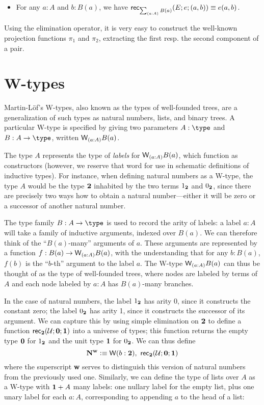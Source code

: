 \begin{itemize}
\item For any $a : A$ and $b : B(a)$, we have $\rec{\sm{a:A} B(a)}(E;e;(a,b)) \equiv e(a,b)$.
\end{itemize}
Using the elimination operator, it is very easy to construct the well-known projection functions $\pi_1$ and $\pi_2$, extracting the first resp. the second component of a pair.


\section{W-types}
\label{sec:w-types}

Martin-L{\"o}f's W-types, also known as the types of well-founded trees, are a generalization of such types as natural numbers, lists, and binary trees. A particular W-type is specified by giving two parameters $A : \type$ and $B : A \to \type$, written $\wtype{a:A} B(a)$.

The type $A$ represents the type of \emph{labels} for $\wtype{a :A} B(a)$, which function as constructors (however, we reserve that word for use in schematic definitions of inductive types). For instance, when defining natural numbers as a W-type, the type $A$ would be the type $\mathbf{2}$ inhabited by the two terms $1_{\mathbf{2}}$ and $0_{\mathbf{2}}$, since there are precisely two ways how to obtain a natural number---either it will be zero or a successor of another natural number. 

The type family $B : A \to \type$ is used to record the arity of labels: a label $a : A$ will take a family of inductive arguments, indexed over $B(a)$. We can therefore think of the ``$B(a)$-many'' arguments of $a$. These arguments are represented by a function $f : B(a) \to \wtype{a :A} B(a)$, with the understanding that for any $b : B(a)$, $f(b)$ is the ``$b$-th'' argument to the label $a$. The W-type $\wtype{a :A} B(a)$ can thus be thought of as the type of well-founded trees, where nodes are labeled by terms of $A$ and each node labeled by $a : A$ has $B(a)$-many branches.

In the case of natural numbers, the label $1_{\mathbf{2}} $ has arity 0, since it constructs the constant zero; the label $0_{\mathbf{2}}$ has arity 1, since it constructs the successor of its argument. We can capture this by using simple elimination on $\mathbf{2}$ to define a function $\mathsf{rec}_{\mathbf{2}}(\mathcal{U};\mathbf{0};\mathbf{1})$ into a universe of types; this function returns the empty type $\mathbf{0}$ for $1_{\mathbf{2}}$ and the unit type $\mathbf{1}$ for $0_{\mathbf{2}}$. We can thus define
\[ \natw \defeq \wtype{b:\two} \rec\two(\bbU;\zero;\one) \]
where the superscript \textbf{w} serves to distinguish this version of natural numbers from the previously used one.
Similarly, we can define the type of lists over $A$ as a W-type with $\mathbf{1} + A$ many labels: one nullary label for the empty list, plus one unary label for each $a : A$, corresponding to appending $a$ to the head of a list:

